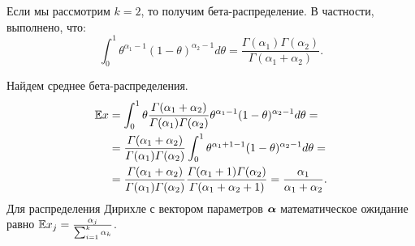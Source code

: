Если мы рассмотрим $k = 2$, то получим бета-распределение.
В частности, выполнено, что:
\[
\int_0^1 \theta^{\alpha_1 - 1} (1 - \theta)^{\alpha_2 - 1} d\theta =  \frac{\Gamma(\alpha_1) \Gamma(\alpha_2)}{\Gamma(\alpha_1 + \alpha_2)}.
\]

\begin{example}
Найдем среднее бета-распределения.
\begin{align*}
\mathbb{E} x &= \int_0^1 \theta \frac{\varGamma(\alpha_1 + \alpha_2)}{\varGamma(\alpha_1) \varGamma(\alpha_2)} \theta^{\alpha_1 - 1} (1 - \theta)^{\alpha_2 - 1}d\theta = \\
&= \frac{\varGamma(\alpha_1 + \alpha_2)}{\varGamma(\alpha_1) \varGamma(\alpha_2)} \int_0^1 \theta^{\alpha_1 + 1 - 1} (1 - \theta)^{\alpha_2 - 1}d\theta = \\
&= \frac{\varGamma(\alpha_1 + \alpha_2)}{\varGamma(\alpha_1) \varGamma(\alpha_2)} 
   \frac{\varGamma(\alpha_1 + 1) \varGamma(\alpha_2)}{\varGamma(\alpha_1 + \alpha_2 + 1)} = \frac{\alpha_1}{\alpha_1 + \alpha_2}.
\end{align*}
Для распределения Дирихле с вектором параметров $\boldsymbol{\alpha}$ математическое ожидание равно $\mathbb{E} x_j = \frac{\alpha_j}{\sum_{i = 1}^k \alpha_k}$.

\end{example}
